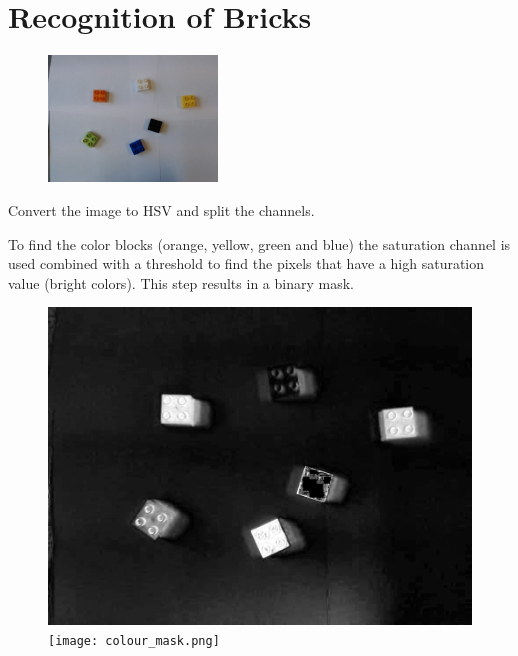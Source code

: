 \chapter{Recognition of Bricks}


\begin{figure}[H]
    \includegraphics[width=0.4\textwidth]{figures/RealLego4.jpg}
    \caption{}
    \label{fig:RealLego4}
\end{figure}

Convert the image to HSV and split the channels.

To find the color blocks (orange, yellow, green and blue) the saturation channel is used combined with a threshold to find the pixels that have a high saturation value (bright colors). This step results in a binary mask.

\begin{figure}[H]
    \captionbox  %
    {               %
        \label{fig:saturation}                                  
    }                                                                 
    {                                                                  
        \includegraphics[width=.4\textwidth]{figures/saturation.png}         
    }                                                                    
    \hspace{5pt}                                                          
    \captionbox
    {       
        \label{fig:colour_mask}                                     
    }
    {
        \texttt{[image: colour\_mask.png]}            
    }                                                                             
\end{figure}

